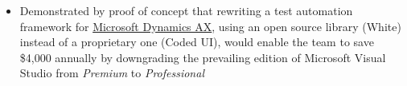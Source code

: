\documentclass[letterpaper]{twentysecondcv} %
\begin{document}
\begin{twenty}
{\begin{itemize}
        \textit{My work opened up a new position in the organization, enabling it to earn additional revenue of \$3,500 per month (estimated)}
        \item Demonstrated by proof of concept that rewriting a test automation framework for \href{https://www.microsoft.com/en-ca/dynamics/erp-ax-overview.aspx}{Microsoft Dynamics AX}, using an open source library (White) instead of a proprietary one (Coded UI), would enable the team to save \$4,000 annually by downgrading the prevailing edition of Microsoft Visual Studio from \textit{Premium} to \textit{Professional}
    \end{itemize}
    	}
        
\end{twenty}
\end{document}
